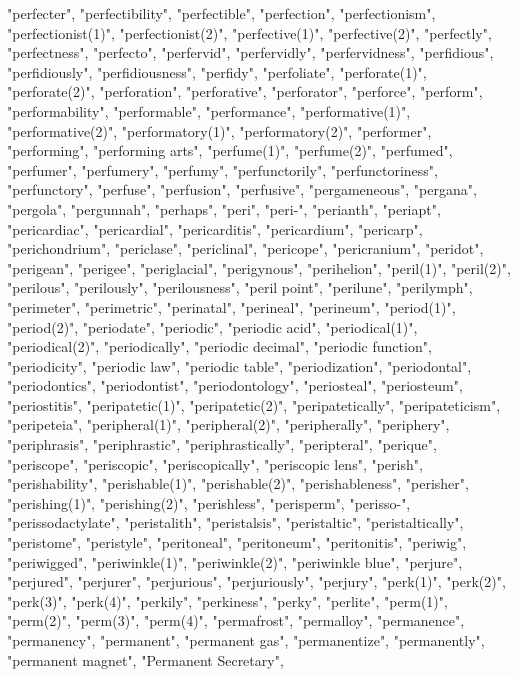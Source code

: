 "perfecter",
"perfectibility",
"perfectible",
"perfection",
"perfectionism",
"perfectionist(1)",
"perfectionist(2)",
"perfective(1)",
"perfective(2)",
"perfectly",
"perfectness",
"perfecto",
"perfervid",
"perfervidly",
"perfervidness",
"perfidious",
"perfidiously",
"perfidiousness",
"perfidy",
"perfoliate",
"perforate(1)",
"perforate(2)",
"perforation",
"perforative",
"perforator",
"perforce",
"perform",
"performability",
"performable",
"performance",
"performative(1)",
"performative(2)",
"performatory(1)",
"performatory(2)",
"performer",
"performing",
"performing arts",
"perfume(1)",
"perfume(2)",
"perfumed",
"perfumer",
"perfumery",
"perfumy",
"perfunctorily",
"perfunctoriness",
"perfunctory",
"perfuse",
"perfusion",
"perfusive",
"pergameneous",
"pergana",
"pergola",
"pergunnah",
"perhaps",
"peri",
"peri-",
"perianth",
"periapt",
"pericardiac",
"pericardial",
"pericarditis",
"pericardium",
"pericarp",
"perichondrium",
"periclase",
"periclinal",
"pericope",
"pericranium",
"peridot",
"perigean",
"perigee",
"periglacial",
"perigynous",
"perihelion",
"peril(1)",
"peril(2)",
"perilous",
"perilously",
"perilousness",
"peril point",
"perilune",
"perilymph",
"perimeter",
"perimetric",
"perinatal",
"perineal",
"perineum",
"period(1)",
"period(2)",
"periodate",
"periodic",
"periodic acid",
"periodical(1)",
"periodical(2)",
"periodically",
"periodic decimal",
"periodic function",
"periodicity",
"periodic law",
"periodic table",
"periodization",
"periodontal",
"periodontics",
"periodontist",
"periodontology",
"periosteal",
"periosteum",
"periostitis",
"peripatetic(1)",
"peripatetic(2)",
"peripatetically",
"peripateticism",
"peripeteia",
"peripheral(1)",
"peripheral(2)",
"peripherally",
"periphery",
"periphrasis",
"periphrastic",
"periphrastically",
"peripteral",
"perique",
"periscope",
"periscopic",
"periscopically",
"periscopic lens",
"perish",
"perishability",
"perishable(1)",
"perishable(2)",
"perishableness",
"perisher",
"perishing(1)",
"perishing(2)",
"perishless",
"perisperm",
"perisso-",
"perissodactylate",
"peristalith",
"peristalsis",
"peristaltic",
"peristaltically",
"peristome",
"peristyle",
"peritoneal",
"peritoneum",
"peritonitis",
"periwig",
"periwigged",
"periwinkle(1)",
"periwinkle(2)",
"periwinkle blue",
"perjure",
"perjured",
"perjurer",
"perjurious",
"perjuriously",
"perjury",
"perk(1)",
"perk(2)",
"perk(3)",
"perk(4)",
"perkily",
"perkiness",
"perky",
"perlite",
"perm(1)",
"perm(2)",
"perm(3)",
"perm(4)",
"permafrost",
"permalloy",
"permanence",
"permanency",
"permanent",
"permanent gas",
"permanentize",
"permanently",
"permanent magnet",
"Permanent Secretary",
